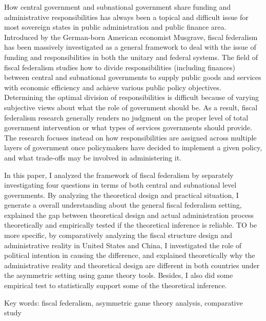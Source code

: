 How central government and subnational government share funding and administrative responsibilities has always been a topical and difficult issue for most sovereign states in public administration and public finance area. Introduced by the German-born American economist Musgrave\cite{musgrave1971economics}, fiscal federalism has been massively investigated as a general framework to deal with the issue of funding and responsibilities in both the unitary and federal systems. The field of fiscal federalism studies how to divide responsibilities (including finances) between central and subnational governments to supply public goods and services with economic efficiency and achieve various public policy objectives. Determining the optimal division of responsibilities is difficult because of varying subjective views about what the role of government should be. As a result, fiscal federalism research generally renders no judgment on the proper level of total government intervention or what types of services governments should provide. The research focuses instead on how responsibilities are assigned across multiple layers of government once policymakers have decided to implement a given policy, and what trade-offs may be involved in administering it.	

In this paper, I analyzed the framework of fiscal federalism by separately investigating four questions in terms of both central and subnational level governments. By analyzing the theoretical design and practical situation, I generate a overall understanding about the general fiscal federalism setting, explained the gap between theoretical design and actual administration process theoretically and empirically tested if the theoretical inference is reliable. TO be more specific, by comparatively analyzing the fiscal structure design and administrative reality in United States and China, I investigated the role of political intention in causing the difference, and explained theoretically why the administrative reality and theoretical design are different in both countries under the asymmetric setting using game theory tools. Besides, I also did some empirical test to statistically support some of the theoretical inference.


Key words: fiscal federalism, asymmetric game theory analysis, comparative study


\vspace{-0.3in}
